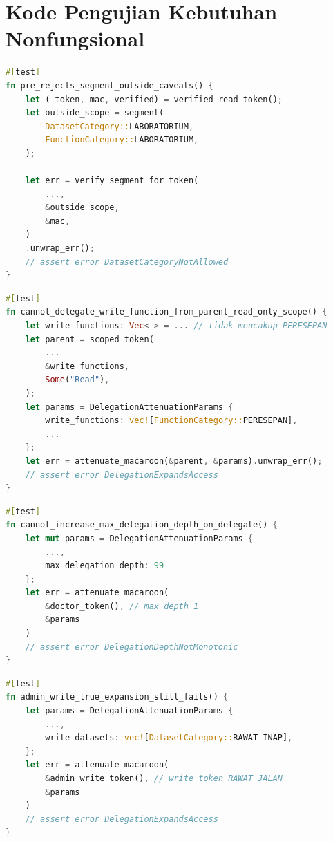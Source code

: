 \chapter{Kode Pengujian Kebutuhan Nonfungsional}
\label{lampiran:kode-pengujian-nonfungsional}

\begin{lstlisting}[language=Rust, caption=Pengujian P-KNF-01 untuk KNF-TA-01, label=lst:kode-pengujian-knf-ta-01]
#[test]
fn pre_rejects_segment_outside_caveats() {
	let (_token, mac, verified) = verified_read_token();
	let outside_scope = segment(
		DatasetCategory::LABORATORIUM,
		FunctionCategory::LABORATORIUM,
	);

	let err = verify_segment_for_token(
		...,
		&outside_scope,
		&mac,
	)
	.unwrap_err();
	// assert error DatasetCategoryNotAllowed
}
\end{lstlisting}

\begin{lstlisting}[language=Rust, caption=Pengujian P-KNF-03 untuk KNF-TA-02, label=lst:kode-pengujian-knf-ta-02-a]
#[test]
fn cannot_delegate_write_function_from_parent_read_only_scope() {
    let write_functions: Vec<_> = ... // tidak mencakup PERESEPAN
    let parent = scoped_token(
        ...
        &write_functions,
        Some("Read"),
    );
    let params = DelegationAttenuationParams {
        write_functions: vec![FunctionCategory::PERESEPAN],
        ...
    };
    let err = attenuate_macaroon(&parent, &params).unwrap_err();
	// assert error DelegationExpandsAccess
}
\end{lstlisting}

\begin{lstlisting}[language=Rust, caption=Pengujian P-KNF-04 untuk KNF-TA-02, label=lst:kode-pengujian-knf-ta-02-b]
#[test]
fn cannot_increase_max_delegation_depth_on_delegate() {
    let mut params = DelegationAttenuationParams {
        ...,
        max_delegation_depth: 99
    };
    let err = attenuate_macaroon(
		&doctor_token(), // max depth 1
		&params
	)
	// assert error DelegationDepthNotMonotonic
}	
\end{lstlisting}

\begin{lstlisting}[language=Rust, caption=Pengujian P-KNF-05 untuk KNF-TA-02, label=lst:kode-pengujian-knf-ta-02-c]
#[test]
fn admin_write_true_expansion_still_fails() {
    let params = DelegationAttenuationParams {
        ...,
        write_datasets: vec![DatasetCategory::RAWAT_INAP],
    };
    let err = attenuate_macaroon(
		&admin_write_token(), // write token RAWAT_JALAN
		&params
	)
	// assert error DelegationExpandsAccess
}
\end{lstlisting}

